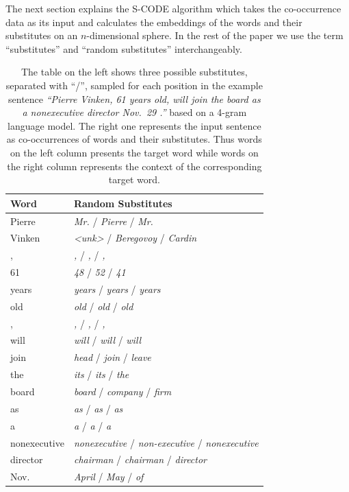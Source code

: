 The next section explains the S-CODE algorithm which takes the
co-occurrence data as its input and calculates the embeddings of the
words and their substitutes on an $n$-dimensional sphere.  In the rest
of the paper we use the term ``substitutes'' and ``random
substitutes'' interchangeably.

\begin{table}[ht]
  \caption{The table on the left shows three possible substitutes, separated
    with ``/'', sampled for each position in the example sentence
    \textit{``Pierre Vinken, 61 years old, will join the board as a
      nonexecutive director Nov.~29 .''} based on a 4-gram language
    model.  The right one represents the input sentence as
    co-occurrences of words and their substitutes.  Thus words on the
    left column presents the target word while words on the right column
    represents the context of the corresponding target word.}
\begin{tabular}{|ll|} \hline
\textbf{Word} & \textbf{Random Substitutes}\\
\hline
Pierre & \textit{Mr.}  / \textit{Pierre} /  \textit{Mr.}\\
Vinken & \textit{<unk>} / \textit{Beregovoy} / \textit{Cardin}\\
, & \textit{,} / \textit{,} / \textit{,}\\
61 & \textit{48} / \textit{52} / \textit{41}\\
years & \textit{years} /  \textit{years} /  \textit{years}\\
old & \textit{old} /  \textit{old} /  \textit{old}\\
, & \textit{,} /  \textit{,} /  \textit{,}\\
will & \textit{will} /  \textit{will} /  \textit{will}\\
join & \textit{head} /  \textit{join} /  \textit{leave}\\
the  & \textit{its} /  \textit{its} /  \textit{the}\\
board & \textit{board} /  \textit{company} / \textit{firm}\\
as & \textit{as} / \textit{as} / \textit{as}\\
a & \textit{a} / \textit{a} / \textit{a}\\
nonexecutive & \textit{nonexecutive} / \textit{non-executive} / \textit{nonexecutive}\\
director & \textit{chairman} / \textit{chairman} / \textit{director}\\
Nov. & \textit{April} / \textit{May} / \textit{of}\\

\end{tabular}
\end{table}
